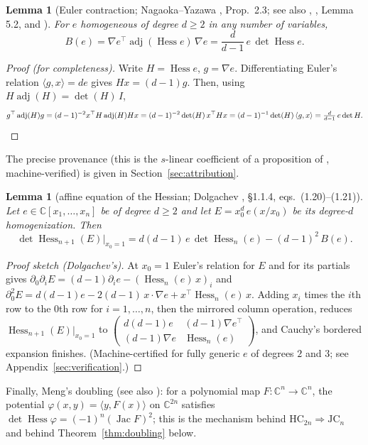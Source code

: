 \documentclass[11pt]{article}
\theoremstyle{plain}
\newtheorem{lemma}[theorem]{Lemma}
\theoremstyle{definition}
\newcommand{\C}{\mathbb{C}}
\newcommand{\Hess}{\operatorname{Hess}}
\newcommand{\adj}{\operatorname{adj}}
\newcommand{\Jac}{\operatorname{Jac}}
\newcommand{\HC}{\mathrm{HC}}
\newcommand{\JC}{\mathrm{JC}}
\begin{document}
\begin{lemma}[Euler contraction; Nagaoka--Yazawa \cite{NY}, Prop.~2.3;
see also \cite{Fox2017}, \cite{DHWZ}, Lemma 5.2, and
\cite{Dolgachev}]\label{lem:identE}
For $e$ homogeneous of degree $d\ge2$ in any number of variables,
\[
B(e)=\nabla e^{\top}\adj(\Hess e)\,\nabla e
=\frac{d}{d-1}\,e\,\det\Hess e .
\]
\end{lemma}

\begin{proof}[Proof (for completeness)]
Write $H=\Hess e$, $g=\nabla e$. Differentiating Euler's relation
$\langle g,x\rangle=de$ gives $Hx=(d-1)g$. Then, using
$H\adj(H)=\det(H)\,I$,
\[
g^{\top}\adj(H)g=(d-1)^{-2}x^{\top}H\adj(H)Hx
=(d-1)^{-2}\det(H)\,x^{\top}Hx
=(d-1)^{-1}\det(H)\,\langle g,x\rangle
=\tfrac{d}{d-1}\,e\det H. \qedhere
\]
\end{proof}

The precise provenance (this is the $s$-linear coefficient of a
proposition of \cite{NY}, machine-verified) is given in
Section~\ref{sec:attribution}.

\begin{lemma}[affine equation of the Hessian; Dolgachev
\cite{Dolgachev}, \S1.1.4, eqs.~(1.20)--(1.21)]\label{lem:identH}
Let $e\in\C[x_1,\dots,x_n]$ be of degree $d\ge2$ and let
$E=x_0^d\,e(x/x_0)$ be its degree-$d$ homogenization. Then
\[
\det\Hess_{n+1}(E)\big|_{x_0=1}
=d(d-1)\,e\,\det\Hess_n(e)-(d-1)^2\,B(e).
\]
\end{lemma}

\begin{proof}[Proof sketch (Dolgachev's)]
At $x_0=1$ Euler's relation for $E$ and for its partials gives
$\partial_0\partial_iE=(d-1)\partial_ie-(\Hess_n(e)\,x)_i$ and
$\partial_0^2E=d(d-1)e-2(d-1)\,x\!\cdot\!\nabla e+x^{\top}\Hess_n(e)\,x$.
Adding $x_i$ times the $i$th row to the $0$th row for $i=1,\dots,n$, then
the mirrored column operation, reduces $\Hess_{n+1}(E)|_{x_0=1}$ to
$\left(\begin{smallmatrix}d(d-1)e&(d-1)\nabla e^{\top}\\
(d-1)\nabla e&\Hess_n(e)\end{smallmatrix}\right)$, and Cauchy's bordered
expansion finishes. (Machine-certified for fully generic $e$ of degrees
$2$ and $3$; see Appendix~\ref{sec:verification}.)
\end{proof}

Finally, Meng's doubling \cite{Meng2006} (see also
\cite[Prop.~2.3]{MengYang}): for a polynomial map $F:\C^n\to\C^n$, the
potential $\varphi(x,y)=\langle y,F(x)\rangle$ on $\C^{2n}$ satisfies
$\det\Hess\varphi=(-1)^n(\Jac F)^2$; this is the mechanism behind
$\HC_{2n}\Rightarrow\JC_n$ and behind Theorem~\ref{thm:doubling} below.
\end{document}
